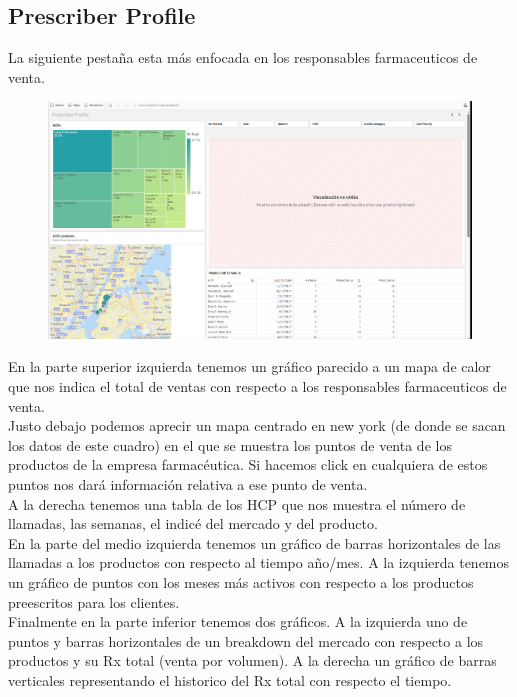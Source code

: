 \documentclass[12pt]{article}
\begin{document}
\clearpage

\subsection{Prescriber Profile}

La siguiente pestaña esta más enfocada en los responsables farmaceuticos de venta.

\begin{figure}[h!]
    \centering
    \includegraphics[width=.8\textwidth]{assets/qlik_2.PNG}
    \label{fig:my_label}
\end{figure}


En la parte superior izquierda tenemos un gráfico parecido a un mapa de calor que nos indica el total de ventas con respecto
a los responsables farmaceuticos de venta.
\\
Justo debajo podemos aprecir un mapa centrado en new york (de donde se sacan los datos de este cuadro) en el que se muestra
los puntos de venta de los productos de la empresa farmacéutica. Si hacemos click en cualquiera de estos puntos nos dará información
relativa a ese punto de venta.
\\
A la derecha tenemos una tabla de los HCP que nos muestra el número de llamadas, las semanas, el indicé del mercado y del producto.
\\
En la parte del medio izquierda tenemos un gráfico de barras horizontales de las llamadas a los productos con respecto al tiempo año/mes.
A la izquierda tenemos un gráfico de puntos con los meses más activos con respecto a los productos preescritos para los clientes.
\\
Finalmente en la parte inferior tenemos dos gráficos. A la izquierda uno de puntos y barras horizontales de un breakdown del mercado
con respecto a los productos y su Rx total (venta por volumen). A la derecha un gráfico de barras verticales representando el historico
del Rx total con respecto el tiempo.
\end{document}
